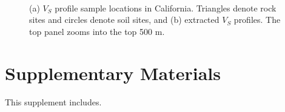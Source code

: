 
\clearpage
{}
\begin{figure}[!ht]
   \\[1.2\baselineskip]%
  \caption{ (a) $V_S$ profile sample locations in California. Triangles denote rock sites and circles denote soil sites, and (b) extracted $V_S$ profiles. The top panel zooms into the top 500 m. }
  \label{fig:highf-7}
\end{figure}


\setcounter{table}{0}
\setcounter{figure}{0}
\renewcommand{\thetable}{S\arabic{chapter}.\arabic{table}}
\renewcommand{\thefigure}{S\arabic{chapter}.\arabic{figure}}
\newpage
\section*{Supplementary Materials}

This supplement includes.




\renewcommand{\thetable}{\arabic{table}}
\renewcommand{\thefigure}{\arabic{figure}}


